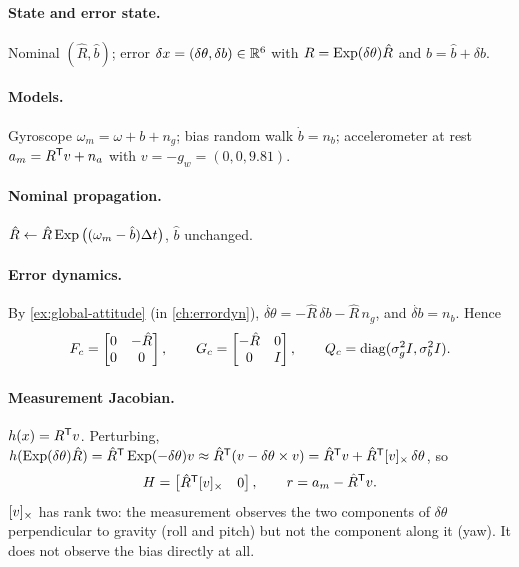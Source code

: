 \paragraph{State and error state.} Nominal $(\hat R, \hat b)$; error $\delta x = (\delta\theta, \delta b) \in \mathbb{R}^6$ with $R = \operatorname{Exp}(\delta\theta)\hat R$ and $b = \hat b + \delta b$.

\paragraph{Models.} Gyroscope $\omega_m = \omega + b + n_g$; bias random walk $\dot b = n_b$; accelerometer at rest $a_m = R^{\mathsf{T}} v + n_a$ with $v = -g_w = (0, 0, 9.81)$.

\paragraph{Nominal propagation.} $\hat R \gets \hat R\operatorname{Exp}\big((\omega_m - \hat b){\Delta t}\big)$, $\hat b$ unchanged.

\paragraph{Error dynamics.} By \cref{ex:global-attitude} (in \cref{ch:errordyn}), $\dot{\delta\theta} = -\hat R\,\delta b - \hat R\,n_g$, and $\dot{\delta b} = n_b$. Hence
\begin{equation}
  F_c = \begin{bmatrix} 0 & -\hat R \\ 0 & 0\end{bmatrix}, \qquad G_c = \begin{bmatrix} -\hat R & 0 \\ 0 & I\end{bmatrix}, \qquad Q_c = \operatorname{diag}(\sigma_g^2I, \sigma_b^2I).
\end{equation}

\paragraph{Measurement Jacobian.} $h(x) = R^{\mathsf{T}} v$. Perturbing, $h(\operatorname{Exp}(\delta\theta)\hat R) = \hat R^{\mathsf{T}}\operatorname{Exp}(-\delta\theta)v \approx \hat R^{\mathsf{T}}(v - \delta\theta\times v) = \hat R^{\mathsf{T}} v + \hat R^{\mathsf{T}}[v]_{\times}\,\delta\theta$, so
\begin{equation}
  H = \begin{bmatrix} \hat R^{\mathsf{T}}[v]_{\times} & 0 \end{bmatrix}, \qquad r = a_m - \hat R^{\mathsf{T}} v .
\end{equation}
$[v]_{\times}$ has rank two: the measurement observes the two components of $\delta\theta$ perpendicular to gravity (roll and pitch) but not the component along it
(yaw). It does not observe the bias directly at all.

